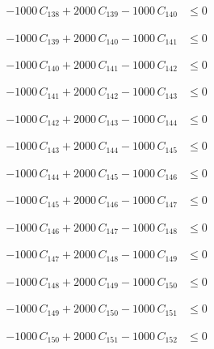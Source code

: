 \documentclass[a4paper,11pt]{article}
\begin{document}
\begin{align}
-1000\,C_{138} + 2000\,C_{139} - 1000\,C_{140} &\leq 0 \nonumber
\end{align}

\begin{align}
-1000\,C_{139} + 2000\,C_{140} - 1000\,C_{141} &\leq 0 \nonumber
\end{align}

\begin{align}
-1000\,C_{140} + 2000\,C_{141} - 1000\,C_{142} &\leq 0 \nonumber
\end{align}

\begin{align}
-1000\,C_{141} + 2000\,C_{142} - 1000\,C_{143} &\leq 0 \nonumber
\end{align}

\begin{align}
-1000\,C_{142} + 2000\,C_{143} - 1000\,C_{144} &\leq 0 \nonumber
\end{align}

\begin{align}
-1000\,C_{143} + 2000\,C_{144} - 1000\,C_{145} &\leq 0 \nonumber
\end{align}

\begin{align}
-1000\,C_{144} + 2000\,C_{145} - 1000\,C_{146} &\leq 0 \nonumber
\end{align}

\begin{align}
-1000\,C_{145} + 2000\,C_{146} - 1000\,C_{147} &\leq 0 \nonumber
\end{align}

\begin{align}
-1000\,C_{146} + 2000\,C_{147} - 1000\,C_{148} &\leq 0 \nonumber
\end{align}

\begin{align}
-1000\,C_{147} + 2000\,C_{148} - 1000\,C_{149} &\leq 0 \nonumber
\end{align}

\begin{align}
-1000\,C_{148} + 2000\,C_{149} - 1000\,C_{150} &\leq 0 \nonumber
\end{align}

\begin{align}
-1000\,C_{149} + 2000\,C_{150} - 1000\,C_{151} &\leq 0 \nonumber
\end{align}

\begin{align}
-1000\,C_{150} + 2000\,C_{151} - 1000\,C_{152} &\leq 0 \nonumber
\end{align}
\end{document}
